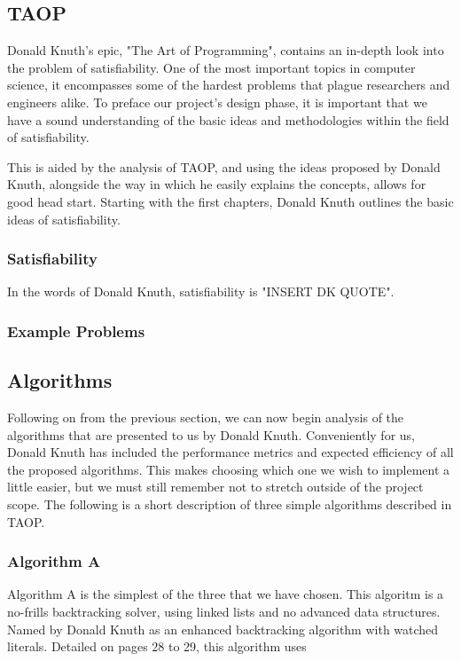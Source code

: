 \documentclass{article}
\begin{document}
\subsection{TAOP}
Donald Knuth's epic, "The Art of Programming", contains an in-depth look into the problem of satisfiability. One of the most important topics in computer
science, it encompasses some of the hardest problems that plague researchers and engineers alike. To preface our project's design phase, it is important
that we have a sound understanding of the basic ideas and methodologies within the field of satisfiability.

This is aided by the analysis of TAOP, and using the ideas proposed by Donald Knuth, alongside the way in which he easily explains the concepts, allows
for good head start. Starting with the first chapters, Donald Knuth outlines the basic ideas of satisfiability.

\subsubsection{Satisfiability}
In the words of Donald Knuth, satisfiability is "INSERT DK QUOTE".

\subsubsection{Example Problems}

\subsection{Algorithms}
Following on from the previous section, we can now begin analysis of the algorithms that are presented to us by Donald Knuth. Conveniently for us,
Donald Knuth has included the performance metrics and expected efficiency of all the proposed algorithms. This makes choosing which one we wish to implement
a little easier, but we must still remember not to stretch outside of the project scope. The following is a short description of three simple algorithms
described in TAOP. %

\subsubsection{Algorithm A}
Algorithm A is the simplest of the three that we have chosen. This algoritm is a no-frills backtracking solver, using linked lists and no advanced data
structures. Named by Donald Knuth as an enhanced backtracking algorithm with watched literals. Detailed on pages 28 to 29, this algorithm
uses
\end{document}
